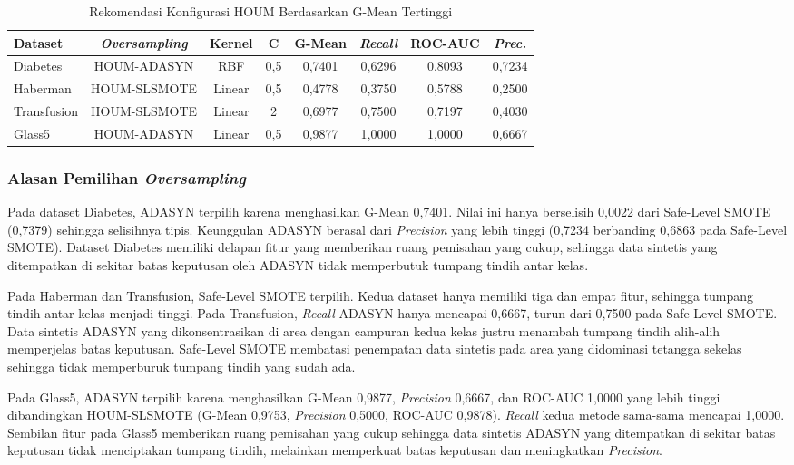 \begin{table}[H]
\centering
\caption{Rekomendasi Konfigurasi HOUM Berdasarkan G-Mean Tertinggi}
\label{table:4.rekomendasi_konfigurasi}
\footnotesize
\begin{tabular}{|l|c|c|c|c|c|c|c|}
\hline
\textbf{Dataset} & \textbf{\textit{Oversampling}} & \textbf{Kernel} & \textbf{C} & \textbf{G-Mean} & \textbf{\textit{Recall}} & \textbf{ROC-AUC} & \textbf{\textit{Prec.}} \\
\hline
Diabetes & HOUM-ADASYN & RBF & 0,5 & 0,7401 & 0,6296 & 0,8093 & 0,7234 \\
Haberman & HOUM-SLSMOTE & Linear & 0,5 & 0,4778 & 0,3750 & 0,5788 & 0,2500 \\
Transfusion & HOUM-SLSMOTE & Linear & 2 & 0,6977 & 0,7500 & 0,7197 & 0,4030 \\
Glass5 & HOUM-ADASYN & Linear & 0,5 & 0,9877 & 1,0000 & 1,0000 & 0,6667 \\
\hline
\end{tabular}
\end{table}

\subsubsection{Alasan Pemilihan \textit{Oversampling}}
Pada dataset Diabetes, ADASYN terpilih karena menghasilkan G-Mean 0,7401. Nilai ini hanya berselisih 0,0022 dari Safe-Level SMOTE (0,7379) sehingga selisihnya tipis. Keunggulan ADASYN berasal dari \textit{Precision} yang lebih tinggi (0,7234 berbanding 0,6863 pada Safe-Level SMOTE). Dataset Diabetes memiliki delapan fitur yang memberikan ruang pemisahan yang cukup, sehingga data sintetis yang ditempatkan di sekitar batas keputusan oleh ADASYN tidak memperbutuk tumpang tindih antar kelas.

Pada Haberman dan Transfusion, Safe-Level SMOTE terpilih. Kedua dataset hanya memiliki tiga dan empat fitur, sehingga tumpang tindih antar kelas menjadi tinggi. Pada Transfusion, \textit{Recall} ADASYN hanya mencapai 0,6667, turun dari 0,7500 pada Safe-Level SMOTE. Data sintetis ADASYN yang dikonsentrasikan di area dengan campuran kedua kelas justru menambah tumpang tindih alih-alih memperjelas batas keputusan. Safe-Level SMOTE membatasi penempatan data sintetis pada area yang didominasi tetangga sekelas sehingga tidak memperburuk tumpang tindih yang sudah ada.

Pada Glass5, ADASYN terpilih karena menghasilkan G-Mean 0,9877, \textit{Precision} 0,6667, dan ROC-AUC 1,0000 yang lebih tinggi dibandingkan HOUM-SLSMOTE (G-Mean 0,9753, \textit{Precision} 0,5000, ROC-AUC 0,9878). \textit{Recall} kedua metode sama-sama mencapai 1,0000. Sembilan fitur pada Glass5 memberikan ruang pemisahan yang cukup sehingga data sintetis ADASYN yang ditempatkan di sekitar batas keputusan tidak menciptakan tumpang tindih, melainkan memperkuat batas keputusan dan meningkatkan \textit{Precision}. \par

